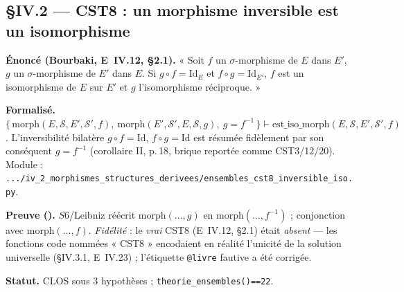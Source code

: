 \subsection{§IV.2 --- CST8 : un morphisme inversible est un isomorphisme}
\textbf{Énoncé (Bourbaki, E~IV.12, §2.1).} « Soit $f$ un $\sigma$-morphisme de $E$ dans $E'$,
$g$ un $\sigma$-morphisme de $E'$ dans $E$. Si $g\circ f=\mathrm{Id}_E$ et $f\circ g=\mathrm{Id}_{E'}$,
$f$ est un isomorphisme de $E$ sur $E'$ et $g$ l'isomorphisme réciproque. »

\textbf{Formalisé.} $\{\,\mathrm{morph}(E,\mathscr S,E',\mathscr S',f),\
\mathrm{morph}(E',\mathscr S',E,\mathscr S,g),\ g=f^{-1}\,\}\vdash
\mathrm{est\_iso\_morph}(E,\mathscr S,E',\mathscr S',f)$. L'inversibilité bilatère
$g\circ f=\mathrm{Id}$, $f\circ g=\mathrm{Id}$ est résumée fidèlement par son conséquent
$g=f^{-1}$ (corollaire II, p.\,18, brique reportée comme CST3/12/20). Module :
\texttt{.../iv\_2\_morphismes\_structures\_derivees/ensembles\_cst8\_inversible\_iso.py}.

\textbf{Preuve (\Nstar).} $S6$/Leibniz réécrit $\mathrm{morph}(\dots,g)$ en
$\mathrm{morph}(\dots,f^{-1})$ ; conjonction avec $\mathrm{morph}(\dots,f)$. \emph{Fidélité} :
le \emph{vrai} CST8 (E~IV.12, §2.1) était \emph{absent} --- les fonctions code nommées « CST8 »
encodaient en réalité l'unicité de la solution universelle (§IV.3.1, E~IV.23) ; l'étiquette
\texttt{@livre} fautive a été corrigée.

\textbf{Statut.} CLOS sous $3$ hypothèses ; \texttt{theorie\_ensembles()==22}.
